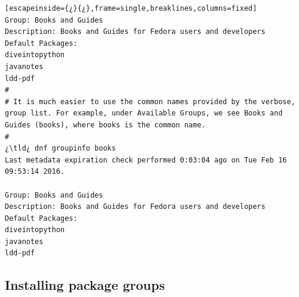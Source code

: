 \begin{lstlisting}[escapeinside={¿}{¿},frame=single,breaklines,columns=fixed]
Group: Books and Guides
Description: Books and Guides for Fedora users and developers
Default Packages:
diveintopython
javanotes
ldd-pdf
#
# It is much easier to use the common names provided by the verbose, group list. For example, under Available Groups, we see Books and Guides (books), where books is the common name.
#
¿\tld¿ dnf groupinfo books
Last metadata expiration check performed 0:03:04 ago on Tue Feb 16 09:53:14 2016.

Group: Books and Guides
Description: Books and Guides for Fedora users and developers
Default Packages:
diveintopython
javanotes
ldd-pdf
\end{lstlisting}

\subsection{Installing package groups}

